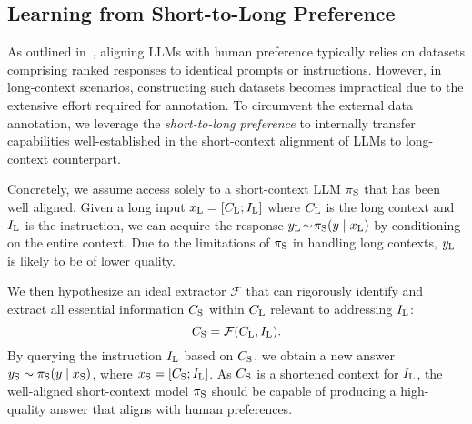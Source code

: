 








\subsection{Learning from Short-to-Long Preference}
\label{subsec:short_to_long_p}


As outlined in~, aligning LLMs with human preference typically relies on datasets comprising ranked responses to identical prompts or instructions. However, in long-context scenarios, constructing such datasets becomes impractical due to the extensive effort required for annotation. To circumvent the external data annotation, we leverage the \textit{short-to-long preference} to internally transfer capabilities well-established in the short-context alignment of LLMs to long-context counterpart.

Concretely, we assume access solely to a short-context LLM $\pi_\text{S}$ that has been well aligned. Given a long input $x_\text{L} = [C_\textrm{L}; I_\text{L}]$ where $C_\textrm{L}$ is the long context and $I_\text{L}$ is the instruction, we can acquire the response $y_\text{L} \!\sim\! \pi_\text{S}(y \mid x_\text{L})$ by conditioning on the entire context. Due to the limitations of $\pi_\text{S}$ in handling long contexts, $y_\text{L}$ is likely to be of lower quality.


We then hypothesize an ideal extractor $\mathcal{F}$ that can rigorously identify and extract all essential information $C_\text{S}$ within $C_\textrm{L}$ relevant to addressing $I_\text{L}$:
\begin{equation}
\label{eq:extractor}
    C_\text{S} = \mathcal{F}(C_\textrm{L}, I_\text{L}).
\end{equation}
By querying the instruction $I_\text{L}$ based on $C_\text{S}$, we obtain a new answer $y_\text{S} \sim \pi_\text{S}(y \mid x_\text{S})$, where $x_\text{S} = [C_\text{S}; I_\text{L}]$. 
As $C_\text{S}$ is a shortened context for $I_\text{L}$, the well-aligned short-context model $\pi_\text{S}$ should be capable of producing a high-quality answer that aligns with human preferences.

